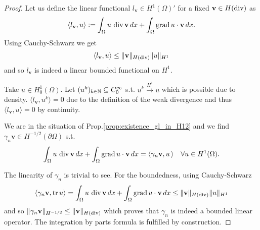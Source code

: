 \documentclass[../main.tex]{subfiles}
\begin{document}
\begin{proof}
    Let us define 
    the linear functional $l_\mathbf{v} \in H^1(\Omega)'$ for a fixed $\mathbf{v} \in H(\operatorname{div})$
    as
    \begin{align*}
        \langle l_\mathbf{v}, u \rangle \vcentcolon= \int_\Omega u \, \operatorname{div} \mathbf{v} \, dx 
         + \int_\Omega \operatorname{grad} u \cdot \mathbf{v} \, dx.
    \end{align*}
    Using Cauchy-Schwarz we get
    \begin{align*}
        \langle l_\mathbf{v}, u \rangle 
        \leq \lVert \mathbf{v} \rVert _{H(\operatorname{div})} \lVert u \rVert _{H^1} 
    \end{align*}
    and so $l_\mathbf{v}$ is indeed a linear bounded functional on $H^1$.
    
    Take $u \in H^1_0(\Omega)$. 
    Let $(u^k)_{k\in \mathbb{N}} \subseteq C^\infty_0$ s.t. 
    $u^k \xrightarrow{H^1} u$ which is possible due to density. 
    $\langle l_\mathbf{v}, u^k \rangle  = 0$  due to the 
    definition of the weak divergence and thus $\langle l_\mathbf{v}, u \rangle = 0$
    by continuity.

    We are in the situation of Prop.\ref{prop:existence_gl_in_H12} 
    and we find $\gamma_n \mathbf{v} \in H^{-1/2}(\partial \Omega)$ 
    s.t. 
    \begin{align*}
        \int_\Omega u \, \operatorname{div} \mathbf{v} \, dx 
        + \int_\Omega \operatorname{grad} u \cdot \mathbf{v} \, dx 
        = \langle \gamma_n \mathbf{v}, u \, \rangle \quad \forall u \in H^1(\Omega).
    \end{align*}
    
    The linearity of $\gamma_n$ is trivial to see.
    For the boundedness, using Cauchy-Schwarz 
    \begin{align*}
        \langle \gamma_n \mathbf{v}, \operatorname{tr} u \rangle 
        = \int_\Omega u \, \operatorname{div} \mathbf{v} \, dx 
            + \int_\Omega \operatorname{grad} u \cdot \mathbf{v} \, dx
        \leq \lVert \mathbf{v} \rVert _{H(\operatorname{div})} \lVert u \rVert _{H^1}
    \end{align*}
    and so $\lVert \gamma_n \mathbf{v} \rVert _{H^{-1/2}} \leq \lVert \mathbf{v} \rVert _{H(\operatorname{div})}$
    which proves that $\gamma_n$ is indeed a bounded linear operator. The integration
    by parts formula is fulfilled by construction. 


\end{proof}
\end{document}
